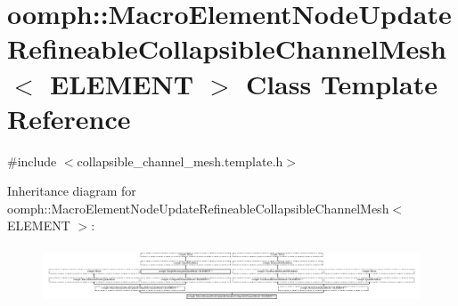\hypertarget{classoomph_1_1MacroElementNodeUpdateRefineableCollapsibleChannelMesh}{}\section{oomph\+:\+:Macro\+Element\+Node\+Update\+Refineable\+Collapsible\+Channel\+Mesh$<$ E\+L\+E\+M\+E\+NT $>$ Class Template Reference}
\label{classoomph_1_1MacroElementNodeUpdateRefineableCollapsibleChannelMesh}


{\ttfamily \#include $<$collapsible\+\_\+channel\+\_\+mesh.\+template.\+h$>$}

Inheritance diagram for oomph\+:\+:Macro\+Element\+Node\+Update\+Refineable\+Collapsible\+Channel\+Mesh$<$ E\+L\+E\+M\+E\+NT $>$\+:\begin{figure}[H]
\begin{center}
\leavevmode
\includegraphics[height=1.696970cm]{classoomph_1_1MacroElementNodeUpdateRefineableCollapsibleChannelMesh}
\end{center}
\end{figure}
